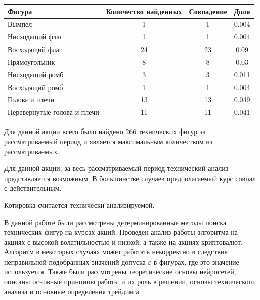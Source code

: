 \documentclass[bachelor, och, coursework]{SCWorks}
\begin{document}
        \begin{table}[!hbt]
            \centering
            \begin{tabular}{|l|c|c|c|}
            \hline
            Фигура                      & \multicolumn{1}{l|}{Количество найденных} & Совпадение & Доля  \\ \hline
            Вымпел                      & 1                                         & 1          & 0.004 \\ \hline
            Нисходящий флаг             & 1                                         & 1          & 0.004 \\ \hline
            Восходящий флаг             & 24                                        & 23         & 0.09  \\ \hline
            Прямоугольник               & 8                                         & 8          & 0.03  \\ \hline
            Нисходящий ромб             & 3                                         & 3          & 0.011 \\ \hline
            Восходящий ромб             & 1                                         & 1          & 0.004 \\ \hline
            Голова и плечи              & 13                                        & 13         & 0.049 \\ \hline
            Перевернутые голова и плечи & 11                                        & 11         & 0.041 \\ \hline
            \end{tabular}
            \end{table}
        
        Для данной акции всего было найдено 266 технических фигур за 
        рассматриваемый период и является максимальным количеством из
        рассматриваемых.
        
        Для данной акции, за весь рассматриваемый период технический анализ 
        представляется возможным. В большинстве случаев предполагаемый курс 
        совпал с действительным.
        
        Котировка считается технически анализируемой.
\conclusion

    В данной работе были рассмотрены детерминированные методы поиска технических
    фигур на курсах акций. Проведен анализ работы алгоритма на акциях с высокой
    волатильностью и низкой, а также на акциях криптовалют. Алгоритм в некоторых
    случаях может работать некорректно в следствие неправильной подобранных
    значений допуска $\varepsilon$ в фигурах, где это значение используется.
    Также были рассмотрены теоретические основы нейросетей, описаны основные
    принципы работы и их роль в решении, основы технического анализа и основные
    определения трейдинга. 
\end{document}
